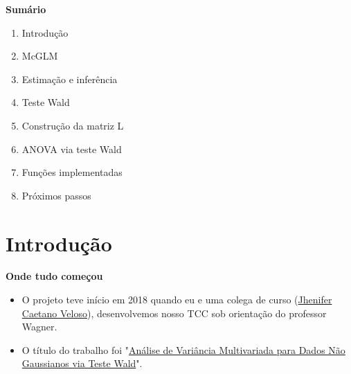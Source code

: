 \documentclass[10pt,
  aspectratio=169,
  serif,
  mathserif,
  professionalfont,
  compress,
  handout,
  ]{beamer}\usepackage[]{graphicx}\usepackage[]{color}
\begin{document}

\begin{frame}[c, allowframebreaks]
  
  \textbf{Sumário}
  
  \begin{enumerate}
  
    \item Introdução
    
    \item McGLM
    
    \item Estimação e inferência
    
    \item Teste Wald
    
    \item Construção da matriz L
    
    \item ANOVA via teste Wald
    
    \item Funções implementadas
    
    \item Próximos passos
    
  \end{enumerate}

\end{frame}


\section{Introdução}

\begin{frame}[c, allowframebreaks]
  
  \textbf{Onde tudo começou}
  
  \begin{itemize}

  \item O projeto teve início em 2018 quando eu e uma colega de curso (\href{https://br.linkedin.com/in/jhecaetano}{Jhenifer Caetano Veloso}), desenvolvemos nosso TCC sob orientação do professor Wagner. 

  \item O título do trabalho foi "\href{https://lineu96.github.io/st/projects/manova/}{Análise de Variância Multivariada para Dados Não Gaussianos via Teste Wald}".
  
  \end{itemize}

\end{frame}
\end{document}
